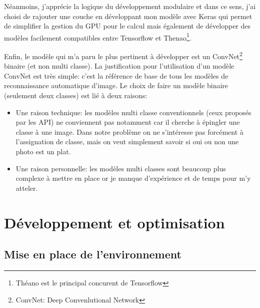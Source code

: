 \documentclass[a4paper,12pt]{report}
\begin{document}
    Néanmoins, j'apprécie la logique du développement modulaire et dans ce sens, j'ai choisi de rajouter une couche en développant mon modèle avec Keras qui permet de simplifier la gestion du GPU pour le calcul mais également de développer des modèles facilement compatibles entre Tensorflow et Thenao\footnote{Théano est le principal concurent de Tensorflow}.
    \medbreak
    \bigbreak

    Enfin, le modèle qui m'a paru le plus pertinent à développer est un ConvNet\footnote{ConvNet: Deep Convenlutional Network} binaire (et non multi classe).
    \medbreak
    La justification pour l'utilisation d'un modèle ConvNet est très simple: c'est la référence de base de tous les modèles de reconnaissance automatique d'image.
    \medbreak
    Le choix de faire un modèle binaire (seulement deux classes) est lié à deux raisons:
    \begin{itemize}
      \item Une raison technique: les modèles multi classe conventionnels (ceux proposés par les API) ne conviennent pas notamment car il cherche à épingler une classe à une image. Dans notre problème on ne s'intéresse pas forcément à l'assignation de classe, mais on veut simplement savoir si oui ou non une photo est un plat.
      \item Une raison personnelle: les modèles multi classes sont beaucoup plus complexe à mettre en place or je manque d'expérience et de temps pour m'y atteler.
    \end{itemize}
    \bigbreak

  \chapter{Développement et optimisation}

    \section{Mise en place de l'environnement}
\end{document}
